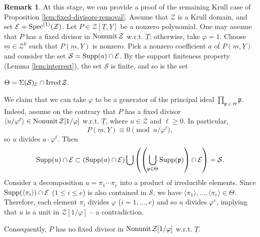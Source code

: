 \documentclass[11pt,a4paper,reqno]{amsart}
\def\s1{{\rm Spec}^{(1)}}
\theoremstyle{definition}
\newtheorem{rmk}[thm]{Remark}
\begin{document}
\begin{rmk}
\label{rmk:fixed-div-finite}
At this stage, we can provide a proof of the remaining Krull case of Proposition \ref{lem:fixed-divisors-removal}. Assume that $\mathcal{Z}$ is a Krull domain, and set  $\mathcal{E}=\s1(\mathcal{Z})$.
Let $P \in \mathcal{Z}[\underline{T},\underline{Y}]$ be a nonzero polynomial.  
One may assume that $P$ has a fixed divisor in ${\rm Nonunit} \hskip 1pt \mathcal{Z}$ \hbox{w.r.t.} $\underline{T}$; otherwise, take $\varphi = 1$. Choose $\underline{m} \in \mathcal{Z}^k$ such that $P(\underline{m},\underline{Y})$ is nonzero. Pick a nonzero coefficient $a$ of $P(\underline{m},\underline{Y})$ and consider the set $\mathcal{S} = {\rm Supp}(a) \cap \mathcal{E}$. By the support finiteness property (Lemma \ref{lem:interrest}), the set 
$\mathcal{S}$ is finite, and so is the set
  
\vskip 1mm

\centerline{$\Theta = \Sigma(\mathcal{S})_{\mathcal{E}} \cap {\rm Irred} \hskip 1pt \mathcal{Z}.$}
\vskip 1mm
  

We claim that we can take $\varphi$ to be a generator of the principal ideal $\prod_{\mathfrak{p} \in \Theta} \mathfrak{p}$. Indeed, assume on the contrary that $P$ has a fixed divisor $\langle u/\varphi^\ell \rangle \in {\rm Nonunit} \hskip 1pt \mathcal{Z}[1/\varphi]$ \hbox{w.r.t.} $\underline{T}$, where $u \in \mathcal{Z}$ and $\ell \geq 0$. In particular,  
\[
P(\underline{m},\underline{Y})\equiv 0 \pmod{u/\varphi^\ell},
\]
so $u$ divides $a \cdot \varphi^\ell$. Then  
$$
{\rm Supp}(u) \cap \mathcal{E} \subset ({\rm Supp} (a) \cap \mathcal{E}) \bigcup \left(\left( \bigcup_{\mathfrak{p} \in \Theta} {\rm Supp}(\mathfrak{p}) \right) \cap \mathcal{E}\right) = \mathcal{S}.
$$
Consider a decomposition $u=\pi_1 \cdots \pi_e$ into a product of irreducible elements. Since ${\rm Supp}(\langle \pi_i \rangle) \cap  \mathcal{E}$ ($1 \leq i \leq e$) is also contained in $\mathcal{S}$, we have $\langle \pi_1 \rangle,\dots,\langle \pi_e \rangle \in \Theta$. Therefore, each element $\pi_i$ divides $\varphi$ ($i=1,\ldots,e$) and so $u$ divides $\varphi^e$, implying that $u$ is a unit in $\mathcal{Z}[1/\varphi]$ -- a contradiction.  

Consequently, $P$ has no fixed divisor in ${\rm Nonunit}\hskip 1pt \mathcal{Z}[1/\varphi]$ \hbox{w.r.t.} $\underline{T}$.  
\end{rmk}
\end{document}
